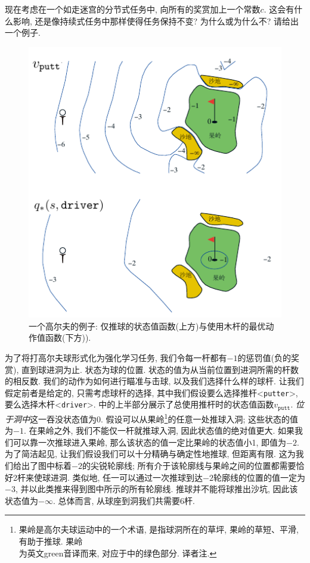 \begin{exer}
现在考虑在一个如走迷宫的分节式任务中, 向所有的奖赏加上一个常数$c$. 这会有什么影响, 还是像持续式任务中那样使得任务保持不变? 为什么或为什么不? 请给出一个例子.
\end{exer}


\begin{exam}[高尔夫]
\begin{figure}[htb]
\centering
\includegraphics[width=.6\textwidth]{c3/img/figure3-3.pdf}
\caption{一个高尔夫的例子: 仅推球的状态值函数(上方)与使用木杆的最优动作值函数(下方)).}\label{fig:3.3}
\end{figure}
为了将打高尔夫球形式化为强化学习任务, 我们令每一杆都有$-1$的惩罚值(负的奖赏), 直到球进洞为止. 状态为球的位置. 状态的值为从当前位置到进洞所需的杆数的相反数. 我们的动作为如何进行瞄准与击球, 以及我们选择什么样的球杆. 让我们假定前者是给定的, 只需考虑球杆的选择, 其中我们假设要么选择推杆<\texttt{putter}>, 要么选择木杆<\texttt{driver}>. 中的上半部分展示了总使用推杆时的状态值函数$v_{\mathtt{putt}}$. \emph{位于洞中}这一吞没状态值为0. 假设可以从果岭\footnote{果岭是高尔夫球运动中的一个术语, 是指球洞所在的草坪, 果岭的草短、平滑, 有助于推球. 果岭\\为英文green音译而来, 对应于中的绿色部分. 译者注.}的任意一处推球入洞; 这些状态的值为$-1$. 在果岭之外, 我们不能仅一杆就推球入洞, 因此状态值的绝对值更大. 如果我们可以靠一次推球进入果岭, 那么该状态的值一定比果岭的状态值小1, 即值为$-2$. 为了简洁起见, 让我们假设我们可以十分精确与确定性地推球, 但距离有限. 这为我们给出了图中标着$-2$的尖锐轮廓线; 所有介于该轮廓线与果岭之间的位置都需要恰好2杆来使球进洞. 类似地, 任一可以通过一次推球到达$-2$轮廓线的位置的值一定为$-3$, 并以此类推来得到图中所示的所有轮廓线. 推球并不能将球推出沙坑, 因此该状态值为$-\infty$. 总体而言, 从球座到洞我们共需要6杆. 
\end{exam}

